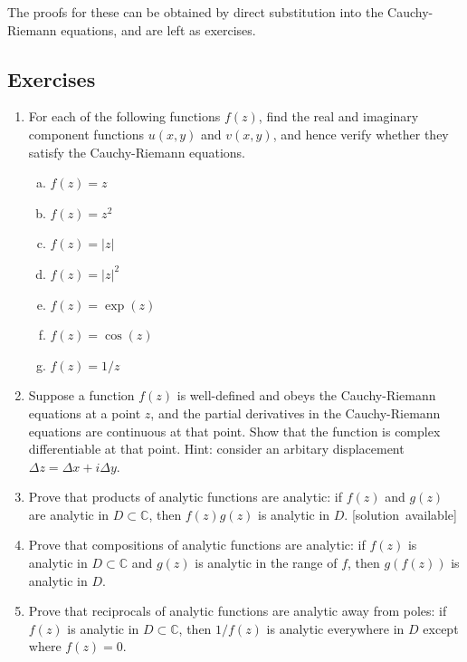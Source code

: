 \documentclass[10pt,a4paper]{article}
\begin{document}
\noindent
The proofs for these can be obtained by direct substitution into the
Cauchy-Riemann equations, and are left as exercises.

\subsection{Exercises}
\label{exercises}

\begin{enumerate}
\item
  For each of the following functions $f(z)$, find the real and
  imaginary component functions $u(x,y)$ and $v(x,y)$, and hence
  verify whether they satisfy the Cauchy-Riemann equations.

  \begin{enumerate}[(a)]
  \item $f(z) = z$
  \item $f(z) = z^2$
  \item $f(z) = |z|$
  \item $f(z) = |z|^2$
  \item $f(z) = \exp(z)$
  \item $f(z) = \cos(z)$
  \item $f(z) = 1/z$
  \end{enumerate}

\item
  Suppose a function $f(z)$ is well-defined and obeys the
  Cauchy-Riemann equations at a point $z$, and the partial derivatives
  in the Cauchy-Riemann equations are continuous at that point. Show
  that the function is complex differentiable at that point. Hint:
  consider an arbitary displacement
  $\Delta z = \Delta x + i \Delta y$.

\item
  Prove that products of analytic functions are analytic: if $f(z)$
  and $g(z)$ are analytic in $D \subset \mathbb{C}$, then
  $f(z) g(z)$ is analytic in $D$.
  \hfill{\scriptsize [solution~available]}

\item
  Prove that compositions of analytic functions are analytic: if
  $f(z)$ is analytic in $D \subset \mathbb{C}$ and $g(z)$ is
  analytic in the range of $f$, then $g(f(z))$ is analytic in $D$.

\item
  Prove that reciprocals of analytic functions are analytic away from
  poles: if $f(z)$ is analytic in $D \subset \mathbb{C}$, then
  $1/f(z)$ is analytic everywhere in $D$ except where $f(z) = 0$.


\end{enumerate}
\end{document}
